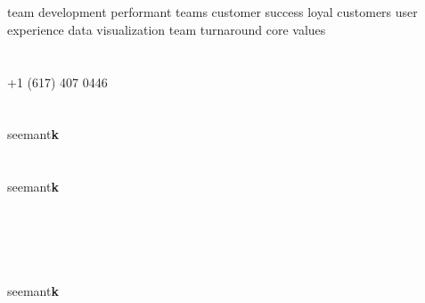 \documentclass[]{friggeri-cv} %
\newcommand{\rotxc}[1]{\begin{sideways}#1\end{sideways}}
\newcommand{\invert}[1]{\rotxc{\rotxc{#1}}}
\begin{document}
\begin{aside} %
\section{{\scriptsize {}}}
team development
performant teams
customer success
loyal customers
user experience
data visualization
team turnaround
core values
~
~
\section{\href{tel:617.407.0446}{\scriptsize {}}}
+1 (617) 407 0446
~
~
\section{\href{skype:seemantk}{}}
seemant\textbf{k}
~
~
\section{\href{mailto:seemantk@gmail.com}{}}
seemant\textbf{k}
~
~
\section{\href{http://www.github.com/seemantk}{} ~ \href{http://www.twitter.com/seemantk}{} ~ \href{http://www.linkedin.com/in/seemantk}{}}
seemant\textbf{k}
\end{aside}


\section{{}{} {\normalsize{}~~}}
\end{document}
